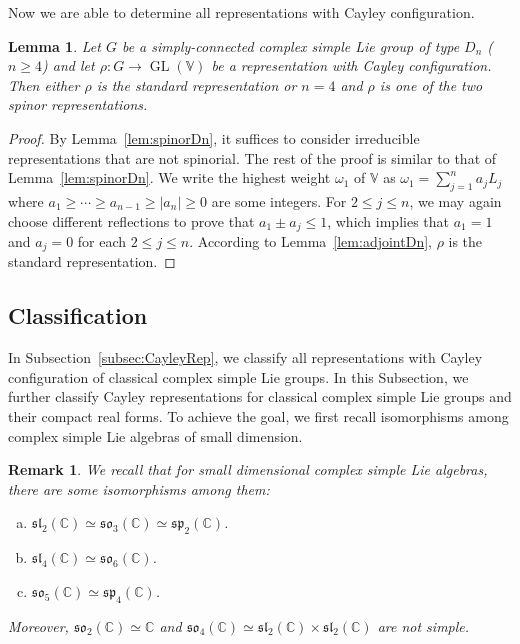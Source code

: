 \documentclass[11pt,reqno]{amsart}
\DeclareMathOperator{\GL}{GL}
\newtheorem{lemma}[theorem]{Lemma}
\newtheorem{remark}[theorem]{Remark}
\newcommand{\CC}{\mathbb{C}} %
\begin{document}
Now we are able to determine all representations with Cayley configuration.
\begin{lemma}\label{lem:Dn}
Let $G$ be a simply-connected complex simple Lie group of type $D_n$ ($n\ge 4$) and let $\rho: G \to \GL(\mathbb{V})$ be a representation with Cayley configuration.  Then either $\rho$ is the standard representation or $n =4$ and $\rho$ is one of the two spinor representations.
\end{lemma}
\begin{proof}
By Lemma~\ref{lem:spinorDn},  it suffices to consider irreducible representations that are not spinorial.  The rest of the proof is similar to that of Lemma~\ref{lem:spinorDn}.  We write the highest weight $\omega_1$ of $\mathbb{V}$ as $\omega_1 = \sum_{j=1}^n a_j L_j$ where $a_1 \ge \cdots \ge a_{n-1} \ge |a_n| \ge 0$ are some integers.  For $2 \le j \le n$,  we may again choose different reflections to prove that $a_1 \pm a_j \le 1$,  which implies that $a_1 = 1$ and $a_j = 0$ for each $2 \le j \le n$.  According to Lemma~\ref{lem:adjointDn},  $\rho$ is the standard representation.
\end{proof}
\subsection{Classification}
In Subsection~\ref{subsec:CayleyRep}, we classify all representations with Cayley configuration of classical complex simple Lie groups.  In this Subsection,  we further classify Cayley representations for classical complex simple Lie groups and their compact real forms.  To achieve the goal,  we first recall isomorphisms among complex simple Lie algebras of small dimension.
\begin{remark}\label{rmk:small}
We recall that for small dimensional complex simple Lie algebras,  there are some isomorphisms among them: 
\begin{enumerate}[(a)]
\item $\mathfrak{sl}_2(\CC)\simeq \mathfrak{so}_3(\CC)  \simeq \mathfrak{sp}_2(\CC)$.
\item $\mathfrak{sl}_4(\CC)\simeq \mathfrak{so}_6(\CC)$.
\item $\mathfrak{so}_5(\CC) \simeq \mathfrak{sp}_4(\CC)$.
\end{enumerate}
Moreover,  $\mathfrak{so}_2(\CC) \simeq \mathbb{C}$ and $\mathfrak{so}_4(\CC)\simeq \mathfrak{sl}_2(\CC) \times \mathfrak{sl}_2(\CC)$ are not simple.
\end{remark}
\end{document}
